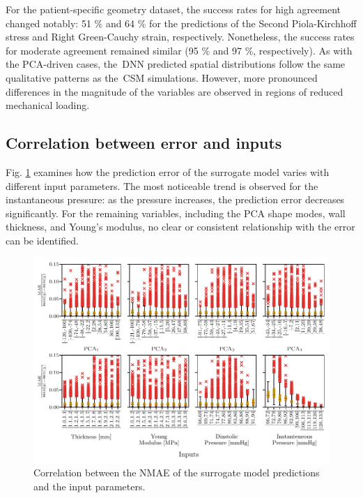 \documentclass[a4paper,fleqn]{cas-sc}
\begin{document}
    For the patient-specific geometry dataset, the success rates for high agreement changed notably: 51 \% and 64 \% for the predictions of the Second Piola-Kirchhoff stress and Right Green-Cauchy strain, respectively. Nonetheless, the success rates for moderate agreement remained similar (95 \% and 97 \%, respectively). As with the PCA-driven cases, the~\gls{DNN} predicted spatial distributions follow the same qualitative patterns as the~\gls{CSM} simulations. However, more pronounced differences in the magnitude of the variables are observed in regions of reduced mechanical loading.

\subsection{Correlation between error and inputs}
  Fig. \ref{fig:inVsout} examines how the prediction error of the surrogate model varies with different input parameters. The most noticeable trend is observed for the instantaneous pressure: as the pressure increases, the prediction error decreases significantly. For the remaining variables, including the PCA shape modes, wall thickness, and Young's modulus, no clear or consistent relationship with the error can be identified. 
  
  \begin{figure}
    \centering
    \includegraphics[width=.95\textwidth]{fig8}
    \caption{Correlation between the NMAE of the surrogate model predictions and the input parameters.}
    \label{fig:inVsout}
  \end{figure}

\end{document}
